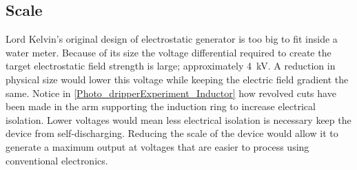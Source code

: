   \subsection*{Scale}

    Lord Kelvin's original design of electrostatic generator is too big to fit inside a water meter.
    Because of its size the voltage differential required to create the target electrostatic field strength is large; approximately \SI{4}{\kilo\volt}.
    A reduction in physical size would lower this voltage while keeping the electric field gradient the same.
    Notice in \cref{Photo_dripperExperiment_Inductor} how revolved cuts have been made in the arm supporting the induction ring to increase electrical isolation.
    Lower voltages would mean less electrical isolation is necessary keep the device from self-discharging.
    Reducing the scale of the device would allow it to generate a maximum output at voltages that are easier to process using conventional electronics.
  
  
%  
%    
%    

